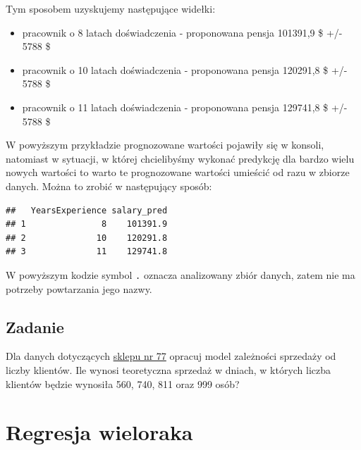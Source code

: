 \documentclass[
]{book}
\newenvironment{Shaded}{\begin{snugshade}}{\end{snugshade}}
\newcommand{\DataTypeTok}[1]{\textcolor[rgb]{0.13,0.29,0.53}{#1}}
\newcommand{\KeywordTok}[1]{\textcolor[rgb]{0.13,0.29,0.53}{\textbf{#1}}}
\newcommand{\NormalTok}[1]{#1}
\newcommand{\OperatorTok}[1]{\textcolor[rgb]{0.81,0.36,0.00}{\textbf{#1}}}
\newcommand{\StringTok}[1]{\textcolor[rgb]{0.31,0.60,0.02}{#1}}
\providecommand{\tightlist}{%
  \setlength{\itemsep}{0pt}\setlength{\parskip}{0pt}}
\begin{document}
Tym sposobem uzyskujemy następujące widełki:

\begin{itemize}
\tightlist
\item
  pracownik o 8 latach doświadczenia - proponowana pensja 101391,9 \$ +/- 5788
  \$
\item
  pracownik o 10 latach doświadczenia - proponowana pensja 120291,8 \$ +/- 5788
  \$
\item
  pracownik o 11 latach doświadczenia - proponowana pensja 129741,8 \$ +/- 5788
  \$
\end{itemize}

W powyższym przykładzie prognozowane wartości pojawiły się w konsoli, natomiast w sytuacji, w której chcielibyśmy wykonać predykcję dla bardzo wielu nowych wartości to warto te prognozowane wartości umieścić od razu w zbiorze danych. Można to zrobić w następujący sposób:

\begin{Shaded}
\end{Shaded}

\begin{verbatim}
##   YearsExperience salary_pred
## 1               8    101391.9
## 2              10    120291.8
## 3              11    129741.8
\end{verbatim}

W powyższym kodzie symbol \texttt{.} oznacza analizowany zbiór danych, zatem nie ma potrzeby powtarzania jego nazwy.

\hypertarget{zadanie}{%
\subsection{Zadanie}\label{zadanie}}

Dla danych dotyczących \href{data/sklep77.xlsx}{sklepu nr 77} opracuj model zależności sprzedaży od liczby klientów. Ile wynosi teoretyczna sprzedaż w dniach, w których liczba klientów będzie wynosiła 560, 740, 811 oraz 999 osób?

\hypertarget{regresja-wieloraka}{%
\section{Regresja wieloraka}\label{regresja-wieloraka}}
\end{document}
